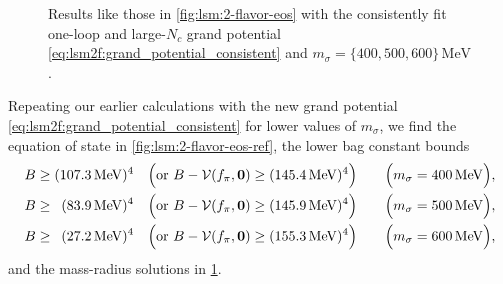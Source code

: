 \begin{figure}[t]
\caption{\label{fig:lsm:2-flavor-mass-radius-ref}%
Results like those in \cref{fig:lsm:2-flavor-eos} with the consistently fit one-loop and large-$N_c$ grand potential \eqref{eq:lsm2f:grand_potential_consistent}
and $m_\sigma = \{400,500,600\} \, \si{\mega\electronvolt}$.
}
\end{figure}

Repeating our earlier calculations with the new grand potential \eqref{eq:lsm2f:grand_potential_consistent} for lower values of $m_\sigma$,
we find the equation of state in \cref{fig:lsm:2-flavor-eos-ref},
the lower bag constant bounds
\begin{subequations}
\begin{align}
	B \geq (\SI{107.3}{\mega\electronvolt})^4           \quad \Big(\text{or } B-\mathcal{V}(f_\pi,{\bm{0}}) \geq (\SI{145.4}{\mega\electronvolt})^4\Big) \qquad \Big(m_\sigma = \SI{400}{\mega\electronvolt}\Big), \\
	B \geq \phantom{0}(\SI{83.9}{\mega\electronvolt})^4 \quad \Big(\text{or } B-\mathcal{V}(f_\pi,{\bm{0}}) \geq (\SI{145.9}{\mega\electronvolt})^4\Big) \qquad \Big(m_\sigma = \SI{500}{\mega\electronvolt}\Big), \\
	B \geq \phantom{0}(\SI{27.2}{\mega\electronvolt})^4  \quad \Big(\text{or } B-\mathcal{V}(f_\pi,{\bm{0}}) \geq (\SI{155.3}{\mega\electronvolt})^4\Big) \qquad \Big(m_\sigma = \SI{600}{\mega\electronvolt}\Big),
\end{align}%
\label{eq:lsm:bag_lower_bound_ref}%
\end{subequations}
and the mass-radius solutions in \cref{fig:lsm:2-flavor-mass-radius-ref}.

